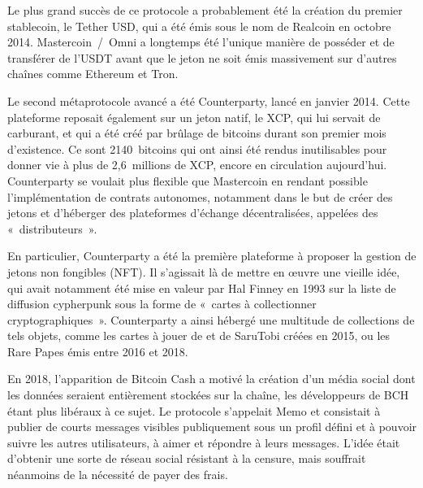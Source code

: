 Le plus grand succès de ce protocole a probablement été la création du premier stablecoin, le Tether USD, qui a été émis sous le nom de Realcoin en octobre 2014. Mastercoin~/~Omni a longtemps été l'unique manière de posséder et de transférer de l'USDT avant que le jeton ne soit émis massivement sur d'autres chaînes comme Ethereum et Tron.

Le second métaprotocole avancé a été Counterparty, lancé en janvier 2014. Cette plateforme reposait également sur un jeton natif, le XCP, qui lui servait de carburant, et qui a été créé par brûlage de bitcoins durant son premier mois d'existence. Ce sont 2140~bitcoins qui ont ainsi été rendus inutilisables pour donner vie à plus de 2,6~millions de XCP, encore en circulation aujourd'hui. Counterparty se voulait plus flexible que Mastercoin en rendant possible l'implémentation de contrats autonomes, notamment dans le but de créer des jetons et d'héberger des plateformes d'échange décentralisées, appelées des «~distributeurs~».

En particulier, Counterparty a été la première plateforme à proposer la gestion de jetons non fongibles (NFT). Il s'agissait là de mettre en œuvre une vieille idée, qui avait notamment été mise en valeur par Hal Finney en 1993 sur la liste de diffusion cypherpunk sous la forme de «~cartes à collectionner cryptographiques~». Counterparty a ainsi hébergé une multitude de collections de tels objets, comme les cartes à jouer de  et de SaruTobi créées en 2015, ou les Rare Papes émis entre 2016 et 2018.

En 2018, l'apparition de Bitcoin Cash a motivé la création d'un média social dont les données seraient entièrement stockées sur la chaîne, les développeurs de BCH étant plus libéraux à ce sujet. Le protocole s'appelait Memo et consistait à publier de courts messages visibles publiquement sous un profil défini et à pouvoir suivre les autres utilisateurs, à aimer et répondre à leurs messages. L'idée était d'obtenir une sorte de réseau social résistant à la censure, mais souffrait néanmoins de la nécessité de payer des frais. 


